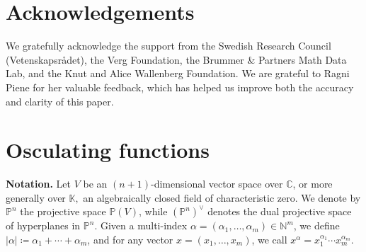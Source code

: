 \documentclass[11pt,reqno]{amsart}
\numberwithin{equation}{section}
\theoremstyle{plain}
\numberwithin{theorem}{section}
\theoremstyle{definition}
\newcommand{\N}{\mathbb{N}}
\renewcommand{\P}{\mathbb{P}}
\newcommand{\C}{\mathbb{C}}
\newcommand{\K}{\mathbb{K}}
\begin{document}
\section*{Acknowledgements}

We gratefully acknowledge the support from the Swedish Research Council (Vetenskapsr{\aa}det), the Verg Foundation, the Brummer \& Partners Math Data Lab, and the Knut and Alice Wallenberg Foundation. We are grateful to Ragni Piene for her valuable feedback, which has helped us improve both the accuracy and clarity of this paper.











\section{Osculating functions}\label{sec: osculating}

{\bf Notation.} Let $V$ be an $(n+1)$-dimensional vector space over $\C$, or more generally over $\K,$ an algebraically closed field of characteristic zero. We denote by $\P^n$ the projective space $\P(V)$, while $(\P^n)^\vee$ denotes the dual projective space of hyperplanes in $\P^n$. Given a multi-index $\alpha=(\alpha_1,\dots,\alpha_m)\in\N^m$, we define $|\alpha|\coloneqq \alpha_1+\cdots+\alpha_m$, and for any vector $x=(x_1,\dots,x_m)$, we call $x^\alpha=x_1^{\alpha_1}\cdots x_m^{\alpha_m}$.
\end{document}
